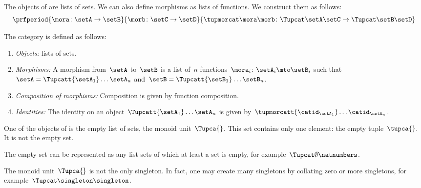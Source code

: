 The objects of \SetL are lists of sets.
We can also define morphisms as lists of functions.
We construct them as follows:
%
\begin{equation}
	\label{eq:sets-monoid-maps2}
	\prfperiod{
		\mora \colon \setA \to \setB
	}{
		\morb \colon \setC \to \setD
	}{
		\tupmorcat \mora \morb \colon \Tupcat \setA   \setC \to \Tupcat \setB  \setD
	}
\end{equation}
%
\begin{definition}
	\label{def:SetL}
	The category \SetL is defined as follows:
	\begin{enumerate}
		\item \emph{Objects:} lists of sets.
		\item \emph{Morphisms:}
		      A morphism from~$\setA$ to~$\setB$ is a list of~$n$ functions~$\mora_i\colon \setA_i \mto \setB_i$ such that~$\setA = \Tupcatt {\setA_1}  \dots {\setA_n}$ and~$\setB = \Tupcatt {\setB_1} \dots {\setB_n}$.
		\item \emph{Composition of morphisms:}
		      Composition is given by function composition.
		\item \emph{Identities:}
		      The identity on an object~$\Tupcatt {\setA_1} \dots {\setA_n}$ is given by~$\tupmorcatt {\catid_{\setA_1}} \dots  {\catid_{\setA_n}} $.
	\end{enumerate}
\end{definition}


One of the objects of \SetL is the empty list of sets, the monoid unit~$\Tupca{ }$.
This set contains only one element: the empty tuple~$\tupca{ }.
$
It is not the empty set.

The empty set can be represented as any list sets of which at least a set is empty, for example~$\Tupcat \emptyset \natnumbers$.

The monoid unit~$\Tupca{ }$ is not the only singleton.
In fact, one may create many singletons by collating zero or more singletons, for example~$\Tupcat \singleton \singleton$.

%

\showslides{
	\begin{forslides}

		\begin{equation}
			\tupca \ela   = \ela
		\end{equation}
		~
		\begin{equation}
			\label{eq:sets-monoid-el-cat}
			\tupcat \ela \elb \elconcat \elc = \tupcatt \ela \elb \elc
		\end{equation}
	\end{forslides}
}
